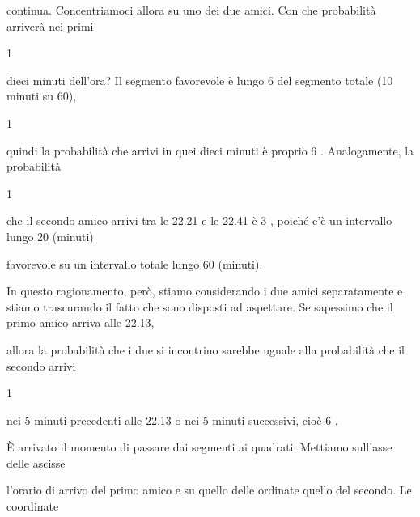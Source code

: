 \documentclass[a4paper,portrait,12pt]{article}
\begin{document}
\begin{flushleft}
continua. Concentriamoci allora su uno dei due amici. Con che probabilit\`{a} arriver\`{a} nei primi
\end{flushleft}


1


\begin{flushleft}
dieci minuti dell'ora? Il segmento favorevole \`{e} lungo 6 del segmento totale (10 minuti su 60),
\end{flushleft}


1


\begin{flushleft}
quindi la probabilit\`{a} che arrivi in quei dieci minuti \`{e} proprio 6 . Analogamente, la probabilit\`{a}
\end{flushleft}


1


\begin{flushleft}
che il secondo amico arrivi tra le 22.21 e le 22.41 \`{e} 3 , poich\'{e} c'\`{e} un intervallo lungo 20 (minuti)
\end{flushleft}


\begin{flushleft}
favorevole su un intervallo totale lungo 60 (minuti).
\end{flushleft}


\begin{flushleft}
In questo ragionamento, per\`{o}, stiamo considerando i due amici separatamente e stiamo trascurando il fatto che sono disposti ad aspettare. Se sapessimo che il primo amico arriva alle 22.13,
\end{flushleft}


\begin{flushleft}
allora la probabilit\`{a} che i due si incontrino sarebbe uguale alla probabilit\`{a} che il secondo arrivi
\end{flushleft}


1


\begin{flushleft}
nei 5 minuti precedenti alle 22.13 o nei 5 minuti successivi, cio\`{e} 6 .
\end{flushleft}


\begin{flushleft}
\`{E} arrivato il momento di passare dai segmenti ai quadrati. Mettiamo sull'asse delle ascisse
\end{flushleft}


\begin{flushleft}
l'orario di arrivo del primo amico e su quello delle ordinate quello del secondo. Le coordinate
\end{flushleft}
\end{document}
